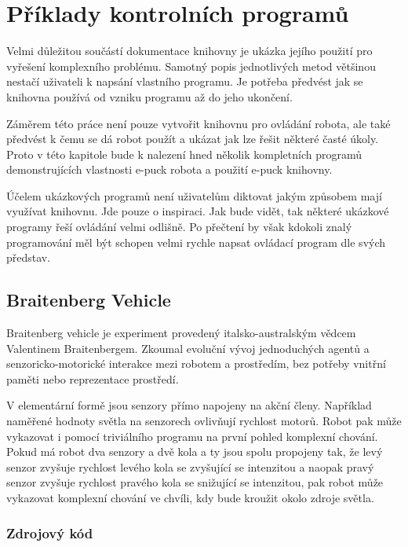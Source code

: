 \chapter{Příklady kontrolních programů}
\label{priklady}

Velmi důležitou součástí dokumentace knihovny je ukázka jejího použití pro
vyřešení komplexního problému. Samotný popis jednotlivých metod většinou
nestačí uživateli k napsání vlastního programu. Je potřeba předvést jak se
knihovna používá od vzniku programu až do jeho ukončení.

Záměrem této práce není pouze vytvořit knihovnu pro ovládání robota, ale také
předvést k čemu se dá robot použít a ukázat jak lze řešit některé časté úkoly.
Proto v této kapitole bude k nalezení hned několik kompletních programů
demonstrujících vlastnosti e-puck robota a použití e-puck knihovny.

Účelem ukázkových programů není uživatelům diktovat jakým způsobem mají
využívat knihovnu. Jde pouze o inspiraci. Jak bude vidět, tak některé ukázkové
programy řeší ovládání velmi odlišně. Po přečtení by však kdokoli znalý
programování měl být schopen velmi rychle napsat ovládací program dle svých
představ.

\section{Braitenberg Vehicle}
\label{braitenberg vehicle}

Braitenberg vehicle je experiment provedený italsko-australským vědcem
Valentinem Braitenbergem. Zkoumal evoluční vývoj jednoduchých agentů a
senzoricko-motorické interakce mezi robotem a prostředím, bez potřeby vnitřní
paměti nebo reprezentace prostředí.

V elementární formě jsou senzory přímo napojeny na akční členy. Například
naměřené hodnoty světla na senzorech ovlivňují rychlost motorů. Robot pak může
vykazovat i pomocí triviálního programu na první pohled komplexní chování.
Pokud má robot dva senzory a dvě kola a ty jsou spolu propojeny tak, že levý
senzor zvyšuje rychlost levého kola se zvyšující se intenzitou a naopak pravý
senzor zvyšuje rychlost pravého kola se snižující se intenzitou, pak robot může
vykazovat komplexní chování ve chvíli, kdy bude kroužit okolo zdroje světla.

\subsection{Zdrojový kód}

